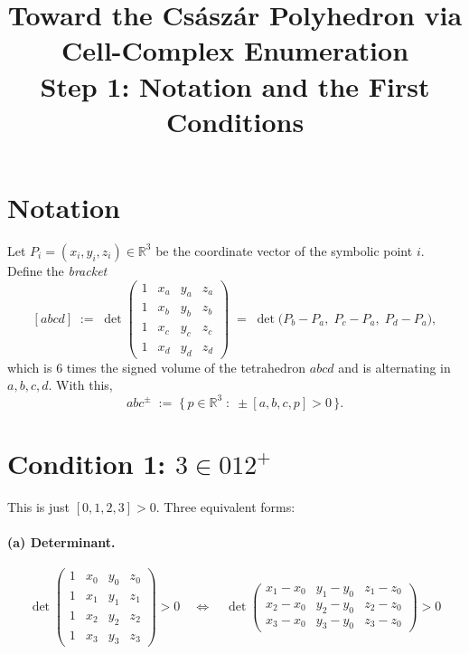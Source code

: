 \documentclass[11pt]{article}
\title{Toward the Cs\'asz\'ar Polyhedron via Cell-Complex Enumeration\\[2pt]
\large Step 1: Notation and the First Conditions}
\author{}
\date{}
\begin{document}
\maketitle

\section*{Notation}

Let $P_i = (x_i, y_i, z_i) \in \mathbb{R}^3$ be the coordinate vector of the symbolic
point $i$. Define the \emph{bracket}
\[
[abcd] \;:=\; \det\!\begin{pmatrix} 1 & x_a & y_a & z_a \\ 1 & x_b & y_b & z_b \\ 1 & x_c & y_c & z_c \\ 1 & x_d & y_d & z_d \end{pmatrix}
\;=\; \det\!\bigl(P_b-P_a,\; P_c-P_a,\; P_d-P_a\bigr),
\]
which is $6$ times the signed volume of the tetrahedron $abcd$ and is alternating in
$a,b,c,d$. With this,
\[
abc^{\pm} \;:=\; \bigl\{\,p\in\mathbb{R}^3 \;:\; \pm[a,b,c,p] > 0\,\bigr\}.
\]

\section*{Condition 1: \texorpdfstring{$3 \in 012^+$}{3 in 012+}}

This is just $[0,1,2,3] > 0$. Three equivalent forms:

\paragraph{(a) Determinant.}
\[
\det\!\begin{pmatrix} 1 & x_0 & y_0 & z_0 \\ 1 & x_1 & y_1 & z_1 \\ 1 & x_2 & y_2 & z_2 \\ 1 & x_3 & y_3 & z_3 \end{pmatrix} > 0
\quad\Longleftrightarrow\quad
\det\!\begin{pmatrix} x_1-x_0 & y_1-y_0 & z_1-z_0 \\ x_2-x_0 & y_2-y_0 & z_2-z_0 \\ x_3-x_0 & y_3-y_0 & z_3-z_0 \end{pmatrix} > 0
\]
\end{document}
